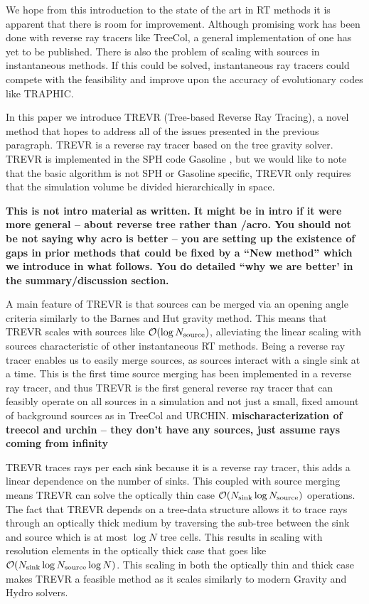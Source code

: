 \documentclass[fleqn,usenatbib]{mnras}
\newcommand{\acro}{TREVR}
\begin{document}
We hope from this introduction to the state of the art in RT methods it is 
apparent that there is room for improvement. Although promising work has been 
done with reverse ray tracers like TreeCol, a general implementation of one has
 yet to be published. There is also the problem of scaling with sources in 
instantaneous methods. If this could be solved, instantaneous ray tracers could
 compete with the feasibility and improve upon the accuracy of evolutionary
 codes like TRAPHIC.

In this paper we introduce \acro{} (Tree-based Reverse Ray Tracing), a novel 
method that hopes to address all of the issues presented in the previous 
paragraph. \acro{} is a reverse ray tracer based on the \cite{barnesHut86} tree
 gravity solver. \acro{} is implemented in the SPH code Gasoline 
\citep{wadsleyEt03}, but we would like to note that the basic algorithm is not
 SPH or Gasoline specific, \acro{} only requires that the simulation volume be 
divided hierarchically in space. 

{\bf This is not intro material as written.  It might be in intro if it were more general -- about reverse tree rather than /acro.  You should not be not saying why acro is better -- you are setting up the existence of gaps in prior methods that could be fixed by a ``New method'' which we introduce in what follows.  You do detailed ``why we are better' in the summary/discussion section. }

A main feature of \acro{} is that sources can be merged via an opening  angle 
criteria similarly to the Barnes and Hut gravity method. This means that 
\acro{} scales with sources like $\mathcal{O}(\log N_{\rm source})$, 
alleviating the linear scaling with sources characteristic of other 
instantaneous RT methods. Being a reverse ray tracer enables us to easily merge
 sources, as sources interact with a single sink at a time. This is 
the first time source merging has been implemented in a reverse ray tracer, and
 thus \acro{} is the first general reverse ray tracer that can feasibly operate
 on all sources in a simulation and not just a small, fixed amount of 
background sources as in TreeCol and URCHIN.
{\bf mischaracterization of treecol and urchin -- they don't have any sources, just assume rays coming from infinity}

\acro{} traces rays per each sink because it is a reverse ray tracer, this 
adds a linear dependence on the number of sinks. This coupled with source 
merging means \acro{} can solve the optically thin case 
$\mathcal{O}(N_{\rm sink} \log N_{\rm source})$ operations. The fact that
 \acro{} depends on a tree-data structure allows it to trace rays through an 
optically thick medium by traversing the sub-tree between the sink and source 
which is at most $\log N$ tree cells. This results in scaling with resolution
 elements in the optically thick case that goes like 
$\mathcal{O}(N_{\rm sink} \log N_{\rm source} \log N)$. This scaling in both 
the optically thin and thick case makes \acro{} a feasible method as it scales 
similarly to modern Gravity and Hydro solvers.
\end{document}
